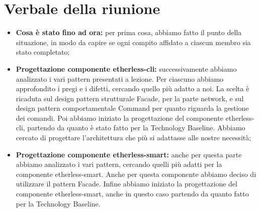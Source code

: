 \section{Verbale della riunione}
	\begin{itemize}
		\item \textbf{Cosa è stato fino ad ora:} per prima cosa, abbiamo fatto il punto della situazione, in modo da capire se ogni compito affidato a ciascun membro sia stato completato;
		\item \textbf{Progettazione componente etherless-cli:} successivamente abbiamo analizzato i vari pattern presentati a lezione. Per ciascuno abbiamo approfondito i pregi e i difetti, cercando quello più adatto a noi. La scelta è ricaduta sul design pattern strutturale Facade, per la parte network, e sul design pattern comportamentale Command per quanto riguarda la gestione dei comandi. Poi abbiamo iniziato la progettazione del componente etherless-cli, partendo da quanto è stato fatto per la Technology Baseline. Abbiamo cercato di progettare l'architettura che più si adattasse alle nostre necessità;
		\item \textbf{Progettazione componente etherless-smart:} anche per questa parte abbiamo analizzato i vari pattern, cercando quelli più adatti per la componente etherless-smart. Anche per questa componente abbiamo deciso di utilizzare il pattern Facade. Infine abbiamo  iniziato la progettazione del componente etherless-smart, anche in questo caso partendo da quanto fatto per la Technology Baseline.
	\end{itemize}